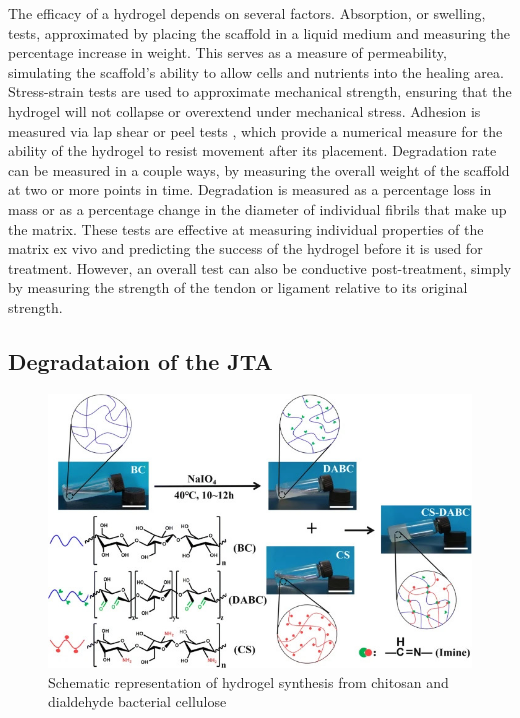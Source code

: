 The efficacy of a hydrogel depends on several factors. Absorption, or swelling, tests,
approximated by placing the scaffold in a liquid medium and measuring the percentage increase
in weight. This serves as a measure of permeability, simulating the scaffold's ability to allow cells
and nutrients into the healing area. Stress-strain tests are used to approximate mechanical
strength, ensuring that the hydrogel will not collapse or overextend under mechanical stress.
Adhesion is measured via lap shear or peel tests \autocite{RN5}, which provide a numerical
measure for the ability of the hydrogel to resist movement after its placement. Degradation rate
can be measured in a couple ways, by measuring the overall weight of the scaffold at two or more
points in time. Degradation is measured as a percentage loss in mass or as a
percentage change in the diameter of individual fibrils that make up the matrix. These tests are
effective at measuring individual properties of the matrix ex vivo and predicting the success of
the hydrogel before it is used for treatment. However, an overall test can also be conductive
post-treatment, simply by measuring the strength of the tendon or ligament relative to its original
strength.

\subsection{Degradataion of the JTA}

\begin{figure}[b]
    \centering 
    \includegraphics[width=0.7\linewidth]{Figures/CS_DABC_condensation.jpg}
    \caption{Schematic representation of hydrogel synthesis from chitosan and dialdehyde bacterial cellulose \autocite{liAllnaturalInjectableHydrogel2020}}
    \label{fig:CS_DABC_condensation}
\end{figure}

